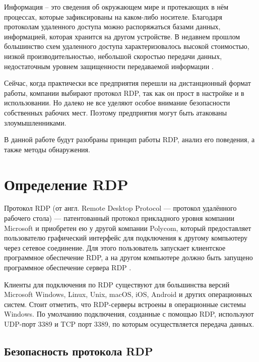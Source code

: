 \documentclass[bachelor, och, coursework]{SCWorks}
\begin{document}


\tableofcontents

\intro
Информация -- это сведения об окружающем мире и протекающих в нём процессах, которые зафиксированы на каком-либо носителе.
Благодаря протоколам удаленного доступа можно распоряжаться базами данных, информацией, которая хранится на другом устройстве. В недавнем прошлом большинство
схем удаленного доступа характеризовалось высокой стоимостью, низкой производительностью, небольшой скоростью передачи данных, недостаточным уровнем защищенности
передаваемой информации \cite{1}. 

Сейчас, когда практически все предприятия перешли на дистанционный формат работы, компании выбирают протокол RDP, так как он прост в настройке и в использовании.
Но далеко не все уделяют особое внимание безопасности собственных рабочих мест. Поэтому предприятия могут быть атакованы злоумышленниками.

В данной работе будут разобраны принцип работы RDP, анализ его поведения, а также методы обнаружения.

\section{Определение RDP}

Протокол RDP (от англ. Remote Desktop Protocol --- протокол удалённого рабочего стола) --- патентованный протокол 
прикладного уровня компании Microsoft и приобретен ею у другой компании Polycom, который предоставляет пользователю графический интерфейс для 
подключения к другому компьютеру через сетевое соединение. Для этого пользователь запускает клиентское программное обеспечение RDP, а на другом 
компьютере должно быть запущено программное обеспечение сервера RDP \cite{2}.

Клиенты для подключения по RDP существуют для большинства версий Microsoft Windows, Linux, Unix, macOS, iOS, Android и 
других операционных систем. Стоит отметить, что RDP-серверы встроены в операционные системы Windows. По умолчанию подключения, созданные с 
помощью RDP, используют UDP-порт 3389 и TCP порт 3389, по которым осуществляется передача данных.

\subsection{Безопасность протокола RDP}
\end{document}
